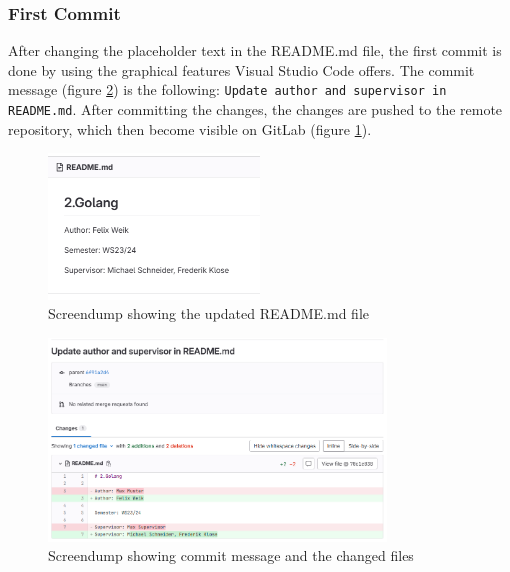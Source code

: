 \subsubsection*{First Commit}
After changing the placeholder text in the README.md file, the first commit is done by using the graphical features Visual Studio Code offers.
The commit message (figure \ref*{fig:screendump_readmeCommitMessage}) is the following: \texttt{Update author and supervisor in README.md}.
After committing the changes, the changes are pushed to the remote repository, which then become visible on GitLab (figure \ref*{fig:screendump_readme}).

\begin{figure}[h]
    \centering
    \includegraphics[width=0.5\textwidth]{figures/goLang/golang_screendumpReadme.png}
    \caption{Screendump showing the updated README.md file}
    \label{fig:screendump_readme}
\end{figure}

\begin{figure}[h]
    \centering
    \includegraphics[width=0.8\textwidth]{figures/goLang/golang_screendumpReadmeCommit.png}
    \caption{Screendump showing commit message and the changed files}
    \label{fig:screendump_readmeCommitMessage}
\end{figure}